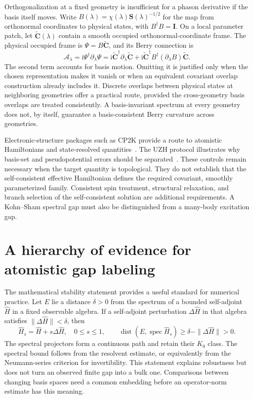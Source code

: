\documentclass[11pt,a4paper]{article}
\newcommand{\spec}{\operatorname{spec}}
\newcommand{\ii}{\mathrm{i}}
\begin{document}
Orthogonalization at a fixed geometry is insufficient for a phason derivative if the basis itself moves. Write $B(\lambda)=\chi(\lambda)\bm S(\lambda)^{-1/2}$ for the map from orthonormal coordinates to physical states, with $B^\dagger B=\bm I$. On a local parameter patch, let $\widetilde{\bm C}(\lambda)$ contain a smooth occupied orthonormal-coordinate frame. The physical occupied frame is $\Psi=B\widetilde{\bm C}$, and its Berry connection is
\begin{equation}
 \mathcal A_\lambda=\ii\Psi^\dagger\partial_\lambda\Psi
 =\ii\widetilde{\bm C}^\dagger\partial_\lambda\widetilde{\bm C}
 +\ii\widetilde{\bm C}^\dagger B^\dagger(\partial_\lambda B)\widetilde{\bm C}.
 \label{eq:basisconnection}
\end{equation}
The second term accounts for basis motion. Omitting it is justified only when the chosen representation makes it vanish or when an equivalent covariant overlap construction already includes it. Discrete overlaps between physical states at neighboring geometries offer a practical route, provided the cross-geometry basis overlaps are treated consistently. A basis-invariant spectrum at every geometry does not, by itself, guarantee a basis-consistent Berry curvature across geometries.

Electronic-structure packages such as CP2K provide a route to atomistic Hamiltonians and state-resolved quantities~\cite{cp2k2020,cp2k2026}. The UZH protocol illustrates why basis-set and pseudopotential errors should be separated~\cite{uzh2026}. These controls remain necessary when the target quantity is topological. They do not establish that the self-consistent effective Hamiltonian defines the required covariant, smoothly parameterized family. Consistent spin treatment, structural relaxation, and branch selection of the self-consistent solution are additional requirements. A Kohn--Sham spectral gap must also be distinguished from a many-body excitation gap.

\section{A hierarchy of evidence for atomistic gap labeling}

The mathematical stability statement provides a useful standard for numerical practice. Let $E$ lie a distance $\delta>0$ from the spectrum of a bounded self-adjoint $\hat H$ in a fixed observable algebra. If a self-adjoint perturbation $\Delta\hat H$ in that algebra satisfies $\|\Delta\hat H\|<\delta$, then
\begin{equation}
 \hat H_s=\hat H+s\Delta\hat H,\quad 0\leq s\leq1,
 \qquad \operatorname{dist}(E,\spec\hat H_s)
 \geq\delta-\|\Delta\hat H\|>0.
 \label{eq:stability}
\end{equation}
The spectral projectors form a continuous path and retain their $K_0$ class. The spectral bound follows from the resolvent estimate, or equivalently from the Neumann-series criterion for invertibility. This statement explains robustness but does not turn an observed finite gap into a bulk one. Comparisons between changing basis spaces need a common embedding before an operator-norm estimate has this meaning.
\end{document}
